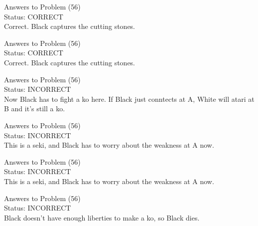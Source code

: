 \documentclass[11pt]{article}
\begin{document}
\begin{minipage}[t]{0.5\textwidth}
  {\centering
  
  Answers to Problem (56)\\
  Status: CORRECT\\
  Correct. Black captures the cutting stones.\\
  }
\end{minipage}
\begin{minipage}[t]{0.5\textwidth}
  {\centering
  
  Answers to Problem (56)\\
  Status: CORRECT\\
  Correct. Black captures the cutting stones.\\
  }
\end{minipage}
\begin{minipage}[t]{0.5\textwidth}
  {\centering
  
  Answers to Problem (56)\\
  Status: INCORRECT\\
  Now Black has to fight a ko here. If Black just conntects at A, White will atari at B and it's still a ko.\\
  }
\end{minipage}
\begin{minipage}[t]{0.5\textwidth}
  {\centering
  
  Answers to Problem (56)\\
  Status: INCORRECT\\
  This is a seki, and Black has to worry about the weakness at A now.\\
  }
\end{minipage}
\begin{minipage}[t]{0.5\textwidth}
  {\centering
  
  Answers to Problem (56)\\
  Status: INCORRECT\\
  This is a seki, and Black has to worry about the weakness at A now.\\
  }
\end{minipage}
\begin{minipage}[t]{0.5\textwidth}
  {\centering
  
  Answers to Problem (56)\\
  Status: INCORRECT\\
  Black doesn't have enough liberties to make a ko, so Black dies.\\
  }
\end{minipage}
\end{document}
